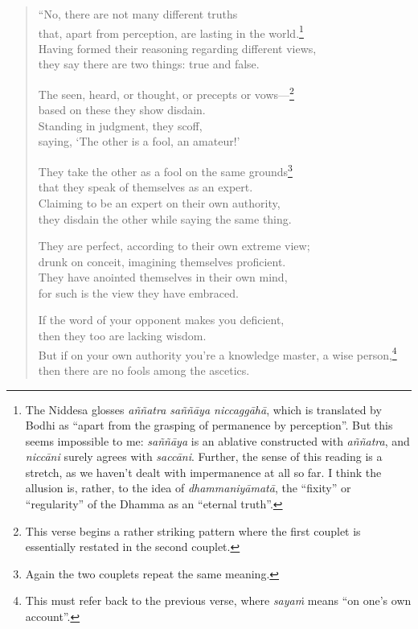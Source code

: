 \documentclass[12pt,openany]{book}%
\begin{document}
\begin{verse}
“No, there are not many different truths \\
that, apart from perception, are lasting in the world.\footnote{The Niddesa glosses \textit{\textsanskrit{aññatra} \textsanskrit{saññāya} \textsanskrit{niccaggāhā}}, which is translated by Bodhi as “apart from the grasping of permanence by perception”. But this seems impossible to me: \textit{\textsanskrit{saññāya}} is an ablative constructed with \textit{\textsanskrit{aññatra}}, and \textit{\textsanskrit{niccāni}} surely agrees with \textit{\textsanskrit{saccāni}}. Further, the sense of this reading is a stretch, as we haven’t dealt with impermanence at all so far. I think the allusion is, rather, to the idea of \textit{\textsanskrit{dhammaniyāmatā}}, the “ﬁxity” or “regularity” of the Dhamma as an “eternal truth”. } \\
Having formed their reasoning regarding different views, \\
they say there are two things: true and false. 

The seen, heard, or thought, or precepts or vows—\footnote{This verse begins a rather striking pattern where the first couplet is essentially restated in the second couplet. } \\
based on these they show disdain. \\
Standing in judgment, they scoff, \\
saying, ‘The other is a fool, an amateur!’ 

They take the other as a fool on the same grounds\footnote{Again the two couplets repeat the same meaning. } \\
that they speak of themselves as an expert. \\
Claiming to be an expert on their own authority, \\
they disdain the other while saying the same thing. 

They are perfect, according to their own extreme view; \\
drunk on conceit, imagining themselves proficient. \\
They have anointed themselves in their own mind, \\
for such is the view they have embraced. 

If the word of your opponent makes you deficient, \\
then they too are lacking wisdom. \\
But if on your own authority you’re a knowledge master, a wise person,\footnote{This must refer back to the previous verse, where \textit{\textsanskrit{sayaṁ}} means “on one’s own account”. } \\
then there are no fools among the ascetics. 


\end{verse}
\end{document}
